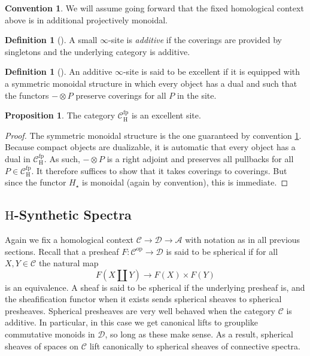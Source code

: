 \documentclass[10pt]{amsart}
\theoremstyle{definition}
\numberwithin{figure}{section}
\numberwithin{equation}{section}
\newtheorem{proposition}[figure]{Proposition}
\newtheorem{definition}[figure]{Definition}
\newtheorem{convention}[figure]{Convention}
\newcommand{\op}{\mathrm{op}}
\newcommand{\cA}{\mathcal{A}}
\newcommand{\cC}{\mathcal{C}}
\newcommand{\cD}{\mathcal{D}}
\theoremstyle{cited}
\newcommand{\fp}{\mathrm{fp}}
\renewcommand{\H}{\mathrm{H}}
\begin{document}
\begin{convention}\label{conv:projectivemonoidality}
  We will assume going forward that the fixed homological context above is in additional projectively monoidal.
\end{convention}

\begin{definition}[\cite{Pst22}]
  A small $\infty$-site is \textit{additive} if the coverings are provided by singletons and the underlying category is additive. 
\end{definition}

\begin{definition}[\cite{Pst22}]
  An additive $\infty$-site is said to be excellent if it is equipped with a symmetric monoidal structure in which every object has a dual and such that the functors $-\otimes P$ preserve coverings for all $P$ in the site.
\end{definition}

\begin{proposition}
  The category $\cC^\fp_\H$ is an excellent site.
\end{proposition}

\begin{proof}
  The symmetric monoidal structure is the one guaranteed by convention \ref{conv:projectivemonoidality}. Because compact objects are dualizable, it is automatic that every object has a dual in $\cC^\fp_\H$. As such, $-\otimes P$ is a right adjoint and preserves all pullbacks for all $P\in \cC^\fp_\H$. It therefore suffices to show that it takes coverings to coverings. But since the functor $H_\star$ is monoidal (again by convention), this is immediate.
\end{proof}

\subsection{$\H$-Synthetic Spectra}

Again we fix a homological context $\cC\to \cD\to \cA$ with notation as in all previous sections. Recall that a presheaf $F:\cC^\op\to \cD$ is said to be spherical if for all $X,Y\in \cC$ the natural map
\[
F(X\amalg Y)\to F(X)\times F(Y)
\]
is an equivalence. A sheaf is said to be spherical if the underlying presheaf is, and the sheafification functor when it exists sends spherical sheaves to spherical presheaves. Spherical presheaves are very well behaved when the category $\cC$ is additive. In particular, in this case we get canonical lifts to grouplike commutative monoids in $\cD$, so long as these make sense. As a result, spherical sheaves of spaces on $\cC$ lift canonically to spherical sheaves of connective spectra.
\end{document}
